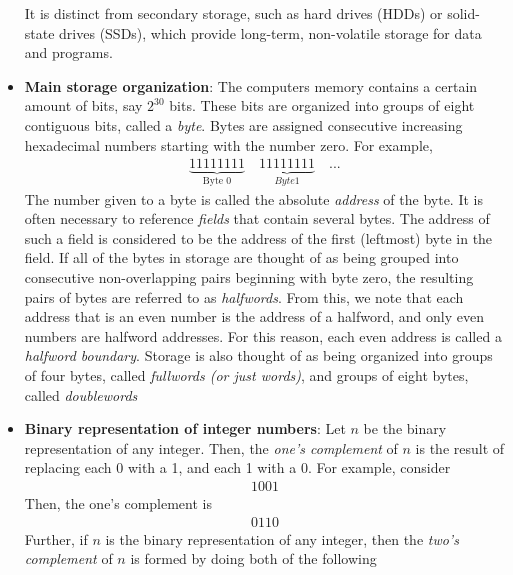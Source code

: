 \documentclass{report}
\begin{document}
\begin{itemize}
\begin{itemize}
            \end{itemize}
            It is distinct from secondary storage, such as hard drives (HDDs) or solid-state drives (SSDs), which provide long-term, non-volatile storage for data and programs.
        \item \textbf{Main storage organization}: The computers memory contains a certain amount of bits, say $2^{30}$ bits. These bits are organized into groups of eight contiguous bits, called a \textit{byte}. Bytes are assigned consecutive increasing hexadecimal numbers starting with the number zero. For example,
            \begin{align*}
                \underbrace{11111111}_{\text{Byte 0}} \quad \underbrace{11111111}_{Byte 1} \quad ...
            \end{align*}
            The number given to a byte is called the absolute \textit{address} of the byte. It is often necessary to reference \textit{fields} that contain several bytes. The address of such a field is considered to be the address of the first (leftmost) byte in the field.
            \bigbreak \noindent 
            If all of the bytes in storage are thought of as being grouped into consecutive non-overlapping pairs beginning with byte zero, the resulting pairs of bytes are referred to as \textit{halfwords}. From this, we note that each address that is an even number is the address of a halfword, and only even numbers are halfword addresses. For this reason, each even address is called a \textit{halfword boundary}.
            \bigbreak \noindent 
            Storage is also thought of as being organized into groups of four bytes, called \textit{fullwords (or just words)}, and groups of eight bytes, called \textit{doublewords}
        \item \textbf{Binary representation of integer numbers}: Let $n$ be the binary representation of any integer. Then, the \textit{one's complement} of $n$ is the result of replacing each 0 with a 1, and each 1 with a 0.  For example, consider
            \begin{align*}
                1001
            \end{align*}
            Then, the one's complement is
            \begin{align*}
                0110
            \end{align*}
            Further, if $n$ is the binary representation of any integer, then the \textit{two's complement} of $n$ is formed by doing both of the following
            \begin{enumerate}

\end{enumerate}
\end{itemize}
\end{document}
